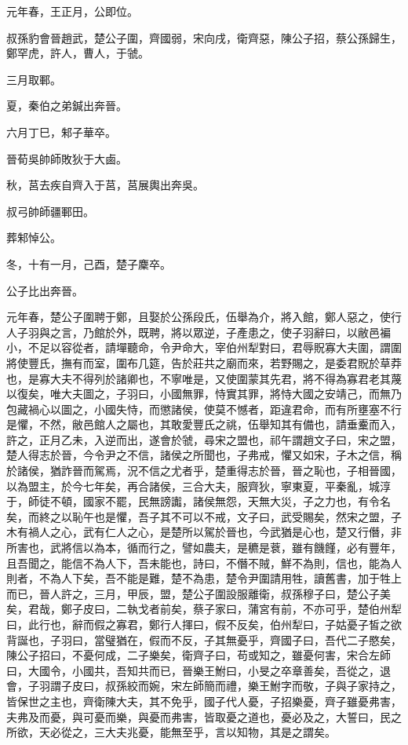 
\begin{pinyinscope}
元年春，王正月，公即位。

叔孫豹會晉趙武，楚公子圍，齊國弱，宋向戌，衛齊惡，陳公子招，蔡公孫歸生，鄭罕虎，許人，曹人，于虢。

三月取鄆。

夏，秦伯之弟鍼出奔晉。

六月丁巳，邾子華卒。

晉荀吳帥師敗狄于大鹵。

秋，莒去疾自齊入于莒，莒展輿出奔吳。

叔弓帥師疆鄆田。

葬邾悼公。

冬，十有一月，己酉，楚子麇卒。

公子比出奔晉。

元年春，楚公子圍聘于鄭，且娶於公孫段氏，伍舉為介，將入館，鄭人惡之，使行人子羽與之言，乃館於外，既聘，將以眾逆，子產患之，使子羽辭曰，以敝邑褊小，不足以容從者，請墠聽命，令尹命大，宰伯州犁對曰，君辱貺寡大夫圍，謂圍將使豐氏，撫有而室，圍布几筵，告於莊共之廟而來，若野賜之，是委君貺於草莽也，是寡大夫不得列於諸卿也，不寧唯是，又使圍蒙其先君，將不得為寡君老其蔑以復矣，唯大夫圖之，子羽曰，小國無罪，恃實其罪，將恃大國之安靖己，而無乃包藏禍心以圖之，小國失恃，而懲諸侯，使莫不憾者，距違君命，而有所壅塞不行是懼，不然，敝邑館人之屬也，其敢愛豐氏之祧，伍舉知其有備也，請垂櫜而入，許之，正月乙未，入逆而出，遂會於虢，尋宋之盟也，祁午謂趙文子曰，宋之盟，楚人得志於晉，今令尹之不信，諸侯之所聞也，子弗戒，懼又如宋，子木之信，稱於諸侯，猶詐晉而駕焉，況不信之尤者乎，楚重得志於晉，晉之恥也，子相晉國，以為盟主，於今七年矣，再合諸侯，三合大夫，服齊狄，寧東夏，平秦亂，城淳于，師徒不頓，國家不罷，民無謗讟，諸侯無怨，天無大災，子之力也，有令名矣，而終之以恥午也是懼，吾子其不可以不戒，文子曰，武受賜矣，然宋之盟，子木有禍人之心，武有仁人之心，是楚所以駕於晉也，今武猶是心也，楚又行僭，非所害也，武將信以為本，循而行之，譬如農夫，是穮是蔉，雖有饑饉，必有豐年，且吾聞之，能信不為人下，吾未能也，詩曰，不僭不賊，鮮不為則，信也，能為人則者，不為人下矣，吾不能是難，楚不為患，楚令尹圍請用牲，讀舊書，加于牲上而已，晉人許之，三月，甲辰，盟，楚公子圍設服離衛，叔孫穆子曰，楚公子美矣，君哉，鄭子皮曰，二執戈者前矣，蔡子家曰，蒲宮有前，不亦可乎，楚伯州犁曰，此行也，辭而假之寡君，鄭行人揮曰，假不反矣，伯州犁曰，子姑憂子皙之欲背誕也，子羽曰，當璧猶在，假而不反，子其無憂乎，齊國子曰，吾代二子愍矣，陳公子招曰，不憂何成，二子樂矣，衛齊子曰，苟或知之，雖憂何害，宋合左師曰，大國令，小國共，吾知共而已，晉樂王鮒曰，小旻之卒章善矣，吾從之，退會，子羽謂子皮曰，叔孫絞而婉，宋左師簡而禮，樂王鮒字而敬，子與子家持之，皆保世之主也，齊衛陳大夫，其不免乎，國子代人憂，子招樂憂，齊子雖憂弗害，夫弗及而憂，與可憂而樂，與憂而弗害，皆取憂之道也，憂必及之，大誓曰，民之所欲，天必從之，三大夫兆憂，能無至乎，言以知物，其是之謂矣。


\end{pinyinscope}
